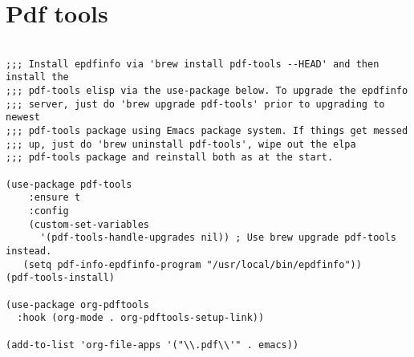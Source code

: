 \documentclass[11pt]{article}
\begin{document}
\section{Pdf tools}
\label{sec:orgbf2fc66}
\begin{verbatim}

;;; Install epdfinfo via 'brew install pdf-tools --HEAD' and then install the
;;; pdf-tools elisp via the use-package below. To upgrade the epdfinfo
;;; server, just do 'brew upgrade pdf-tools' prior to upgrading to newest
;;; pdf-tools package using Emacs package system. If things get messed
;;; up, just do 'brew uninstall pdf-tools', wipe out the elpa
;;; pdf-tools package and reinstall both as at the start.

(use-package pdf-tools
    :ensure t
    :config
    (custom-set-variables
      '(pdf-tools-handle-upgrades nil)) ; Use brew upgrade pdf-tools instead.
   (setq pdf-info-epdfinfo-program "/usr/local/bin/epdfinfo"))
(pdf-tools-install)

(use-package org-pdftools
  :hook (org-mode . org-pdftools-setup-link))

(add-to-list 'org-file-apps '("\\.pdf\\'" . emacs))

\end{verbatim}
\end{document}
